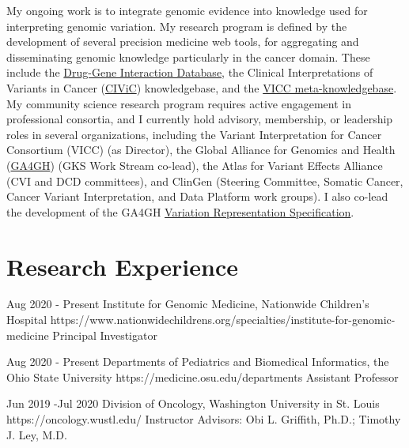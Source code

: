 \documentclass[10pt]{article} %
\begin{document}
My ongoing work is to integrate genomic evidence into knowledge used for interpreting genomic variation. My research program is defined by the development of several precision medicine web tools, for aggregating and disseminating genomic knowledge particularly in the cancer domain. These include the \href{www.dgidb.org}{Drug-Gene Interaction Database}, the Clinical Interpretations of Variants in Cancer
(\href{https://www.civicdb.org}{CIViC}) knowledgebase, and the \href{https://search.cancervariants.org}{VICC meta-knowledgebase}. My community science research program requires active engagement in professional consortia, and I currently hold advisory, membership, or leadership roles in several organizations, including the Variant Interpretation for Cancer Consortium (VICC) (as Director), the Global Alliance for Genomics and Health (\href{https://ga4gh.org}{GA4GH}) (GKS Work Stream co-lead), the Atlas for Variant Effects Alliance (CVI and DCD committees), and ClinGen (Steering Committee, Somatic Cancer, Cancer Variant Interpretation, and Data Platform work groups). I also co-lead the development of the GA4GH \href{https://vrs.ga4gh.org}{Variation Representation Specification}.

\section{Research Experience}

\compjob
{Aug 2020 - }{Present}
{Institute for Genomic Medicine, Nationwide Children's Hospital}
{https://www.nationwidechildrens.org/specialties/institute-for-genomic-medicine}
{Principal Investigator}


\compjob
{Aug 2020 - }{Present}
{Departments of Pediatrics and Biomedical Informatics, the Ohio State University}
{https://medicine.osu.edu/departments}
{Assistant Professor}


\job
{Jun 2019 -}{Jul 2020}
{Division of Oncology, Washington University in St. Louis}
{https://oncology.wustl.edu/}
{Instructor}
{Advisors: Obi L. Griffith, Ph.D.; Timothy J. Ley, M.D.}

\end{document}
